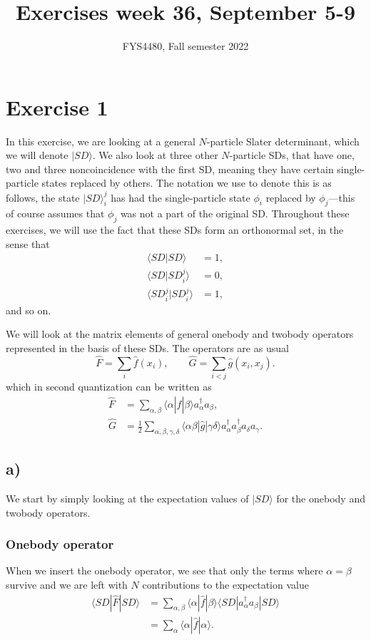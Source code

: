 \documentclass[a4paper, 11pt, notitlepage, english]{article}
\title{Exercises week 36, September 5-9}
\author{FYS4480, Fall semester 2022}
\newcommand{\ket}[1]{|#1 \rangle}
\newcommand{\braket}[2]{\langle #1 | #2 \rangle}
\newcommand{\op}[1]{\hat{#1}}
\newcommand{\braopket}[3]{\langle #1 | {#2} | #3 \rangle}
\begin{document}
\maketitle

\section*{Exercise 1}
In this exercise, we are looking at a general $N$-particle Slater determinant, which we will denote $\ket{SD}$. We also look at three other $N$-particle SDs, that have one, two and three non\-coincidence with the first SD, meaning they have certain single-particle states replaced by others. The notation we use to denote this is as follows, the state $\ket{SD}_i^j$ has had the single-particle state $\phi_i$ replaced by $\phi_j$---this of course assumes that $\phi_j$ was not a part of the original SD. Throughout these exercises, we will use the fact that these SDs form an orthonormal set, in the sense that
\begin{align*}
\braket{SD}{SD} &= 1, \\
\braket{SD}{SD_i^j} &= 0, \\
\braket{SD_i^j}{SD_i^j} &= 1,
\end{align*}
and so on.

We will look at the matrix elements of general onebody and twobody operators represented in the basis of these SDs. The operators are as usual
$$\op{F} = \sum_i \op{f}(x_i), \qquad \op{G}=\sum_{i<j}\op{g}(x_i,x_j).$$
which in second quantization can be written as
\begin{align*}
\op{F} &= \sum_{\alpha, \beta} \braopket{\alpha}{\op{f}}{\beta}a_\alpha^\dag a_\beta, \\
\op{G} &= \frac{1}{2}\sum_{\alpha, \beta, \gamma, \delta} \braopket{\alpha\beta}{\op{g}}{\gamma\delta}a_\alpha^\dag a_\beta^\dag a_\delta a_\gamma.
\end{align*}

\clearpage

\subsection*{a)}
We start by simply looking at the expectation values of $\ket{SD}$ for the onebody and twobody operators.

\subsubsection*{Onebody operator}
When we insert the onebody operator, we see that only the terms where $\alpha=\beta$ survive and we are left with $N$ contributions to the expectation value
\begin{align*}
\braopket{SD}{\op{F}}{SD} 
&= \sum_{\alpha, \beta} \braopket{\alpha}{\op{f}}{\beta}\braopket{SD}{a_\alpha^\dag a_\beta}{SD} \\&= \sum_\alpha \braopket{\alpha}{\op{f}}{\alpha}.		
\end{align*}
\end{document}
